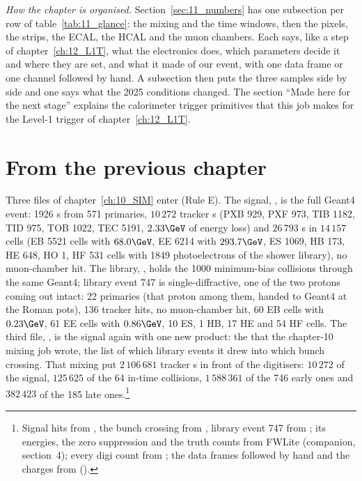 \emph{How the chapter is organised.} Section~\ref{sec:11_numbers} has one subsection per row of
table~\ref{tab:11_glance}: the mixing and the time windows, then the pixels, the strips, the ECAL, the HCAL and the
muon chambers. Each says, like a step of chapter~\ref{ch:12_L1T}, what the electronics does, which parameters decide
it and where they are set, and what it made of our event, with one data frame or one channel followed by hand. A
subsection then puts the three samples side by side and one says what the 2025 conditions changed. The section
``Made here for the next stage'' explains the calorimeter trigger primitives that this job makes for the Level-1
trigger of chapter~\ref{ch:12_L1T}.

\section{From the previous chapter}

Three files of chapter~\ref{ch:10_SIM} enter (Rule E). The signal, ,
is the full Geant4 event: 1926 s from 571 primaries, $10\,272$ tracker s (PXB 929, PXF 973,
TIB 1182, TID 975, TOB 1022, TEC 5191, $2.33\GeV$ of energy loss) and $26\,793$ s in $14\,157$ cells
(EB 5521 cells with $68.0\GeV$, EE 6214 with $293.7\GeV$, ES 1069, HB 173, HE 648, HO 1, HF 531 cells with 1849
photoelectrons of the shower library), no muon-chamber hit. The library,
, holds the 1000 minimum-bias collisions through the same Geant4; library event
747 is single-diffractive, one of the two protons coming out intact: 22 primaries (that proton among them, handed to
Geant4 at the Roman pots), 136 tracker hits, no muon-chamber hit, 60 EB cells with $0.23\GeV$, 61 EE cells with
$0.86\GeV$, 10 ES, 1 HB, 17 HE and 54 HF cells. The third file, , is the signal again
with one new product: the  that the chapter-10 mixing job wrote, the list of which
library events it drew into which bunch crossing. That mixing put $2\,106\,681$ tracker s in front of the
digitisers: $10\,272$ of the signal, $125\,625$ of the 64 in-time collisions, $1\,588\,361$ of the 746 early ones and $382\,423$ of the 185
late ones.\footnote{Signal hits from , the
bunch crossing from , library event 747 from ; its
energies, the zero suppression and the truth counts from FWLite (companion, section~4); every digi count from
; the data frames
followed by hand and the charges from  ().}

